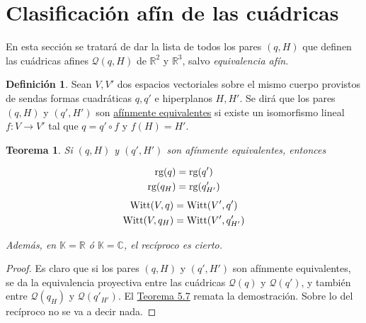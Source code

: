 \documentclass[12pt]{report}
\newtheorem{theorem}{Teorema}[chapter]
\theoremstyle{definition}
\newtheorem{definition}{Definición}[chapter]
\theoremstyle{definition}
\theoremstyle{remark}
\newcommand{\R}{\mathbb R}
\begin{document}
\section{Clasificación afín de las cuádricas}

En esta sección se tratará de dar la lista de todos los pares $(q,H)$ que definen las cuádricas afines $\mathcal{Q}(q,H)$ de $\R^2$ y $\R^3$, salvo \textit{equivalencia afín}.

\begin{definition}
Sean $V, V'$ dos espacios vectoriales sobre el mismo cuerpo provistos de sendas formas cuadráticas $q, q'$ e hiperplanos $H, H'$. Se dirá que los pares $(q,H)$ y $(q',H')$ son \ul{afínmente equivalentes} si existe un isomorfismo lineal $f \colon V \to V'$ tal que $q = q' \circ f$ y $f(H) = H'$.
\end{definition}

\begin{theorem}
Si $(q,H)$ y $(q',H')$ son afínmente equivalentes, entonces
\setlength{\columnsep}{0cm}
\setlength{\columnseprule}{0pt}
\begin{multicols}{2}
\noindent
\begin{align*}
    \textup{rg}(q) &= \textup{rg}(q') \\
    \textup{rg}(q_H) &= \textup{rg}(q_{H'}')
\end{align*}
\begin{align*}
    \textup{Witt}(V,q) &= \textup{Witt}(V',q') \\
    \textup{Witt}(V,q_H) &= \textup{Witt}(V',q_{H'}')
\end{align*}
\end{multicols}
\noindent Además, en $\mathbb{K} = \R$ ó $\mathbb{K} = \mathbb{C}$, el recíproco es cierto.
\end{theorem}

\begin{proof}
    Es claro que si los pares $(q,H)$ y $(q',H')$ son afínmente equivalentes, se da la equivalencia proyectiva entre las cuádricas $\mathcal{Q}(q)$ y $\mathcal{Q}(q')$, y también entre $\mathcal{Q}(q_H)$ y $\mathcal{Q}(q'_{H'})$. El \hyperref[teo5.1.]{\color{blue}Teorema 5.7} remata la demostración. Sobre lo del recíproco no se va a decir nada.
\end{proof}
\end{document}
